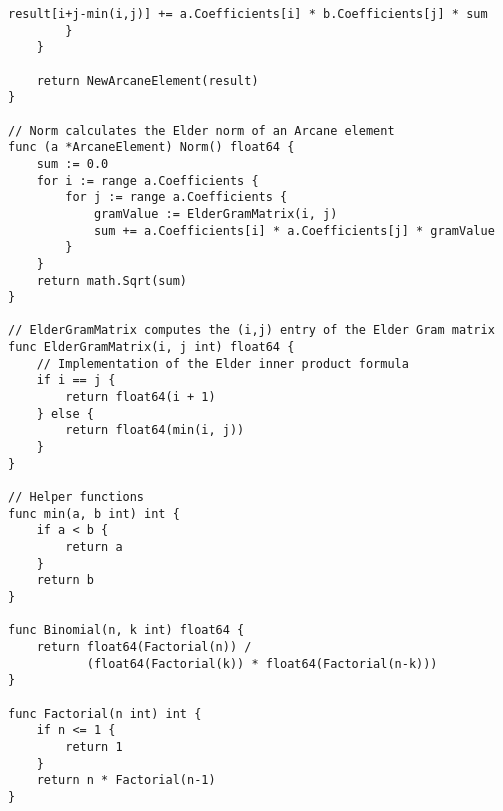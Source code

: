 \begin{lstlisting}[language=golang, caption={Implementation of Elder Algebra in GoLang}]
            result[i+j-min(i,j)] += a.Coefficients[i] * b.Coefficients[j] * sum
        }
    }
    
    return NewArcaneElement(result)
}

// Norm calculates the Elder norm of an Arcane element
func (a *ArcaneElement) Norm() float64 {
    sum := 0.0
    for i := range a.Coefficients {
        for j := range a.Coefficients {
            gramValue := ElderGramMatrix(i, j)
            sum += a.Coefficients[i] * a.Coefficients[j] * gramValue
        }
    }
    return math.Sqrt(sum)
}

// ElderGramMatrix computes the (i,j) entry of the Elder Gram matrix
func ElderGramMatrix(i, j int) float64 {
    // Implementation of the Elder inner product formula
    if i == j {
        return float64(i + 1)
    } else {
        return float64(min(i, j))
    }
}

// Helper functions
func min(a, b int) int {
    if a < b {
        return a
    }
    return b
}

func Binomial(n, k int) float64 {
    return float64(Factorial(n)) / 
           (float64(Factorial(k)) * float64(Factorial(n-k)))
}

func Factorial(n int) int {
    if n <= 1 {
        return 1
    }
    return n * Factorial(n-1)
}
\end{lstlisting}

